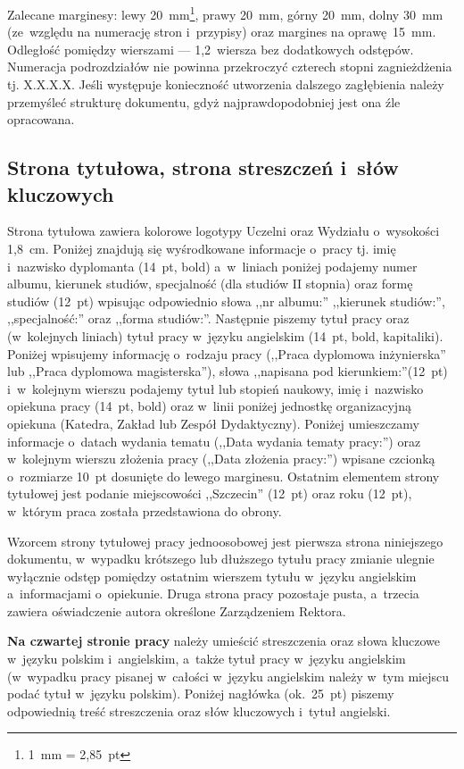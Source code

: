 \documentclass[skorowidz,skroty]{dyplomWEZUT}
\begin{document}
Zalecane marginesy: lewy 20~mm\footnote{1~mm = 2,85~pt}, prawy 20~mm, górny 20~mm, dolny 30~mm (ze~względu na numerację stron i~przypisy) oraz margines na oprawę~15~mm. Odległość pomiędzy wierszami --- 1,2~wiersza bez dodatkowych odstępów. Numeracja podrozdziałów nie powinna przekroczyć czterech stopni zagnieżdżenia tj. X.X.X.X. Jeśli występuje konieczność utworzenia dalszego zagłębienia należy przemyśleć strukturę dokumentu, gdyż najprawdopodobniej jest ona źle opracowana.

\subsection{Strona tytułowa, strona streszczeń i~słów kluczowych}

Strona tytułowa zawiera kolorowe logotypy Uczelni oraz Wydziału o~wysokości 1,8~cm. Poniżej znajdują się wyśrodkowane informacje o~pracy tj. imię i~nazwisko dyplomanta (14~pt, bold) a~w~liniach poniżej podajemy numer albumu, kierunek studiów, specjalność (dla studiów II stopnia) oraz formę studiów (12~pt) wpisując odpowiednio słowa ,,nr albumu:'' ,,kierunek studiów:'', ,,specjalność:'' oraz ,,forma studiów:''. Następnie piszemy tytuł pracy oraz (w~kolejnych liniach) tytuł pracy w~języku angielskim (14~pt, bold, kapitaliki). Poniżej wpisujemy informację o~rodzaju pracy (,,Praca dyplomowa inżynierska'' lub ,,Praca dyplomowa magisterska''), słowa ,,napisana pod kierunkiem:''(12~pt) i~w~kolejnym wierszu podajemy tytuł lub stopień naukowy, imię i~nazwisko opiekuna pracy (14~pt, bold) oraz w~linii poniżej jednostkę organizacyjną opiekuna (Katedra, Zakład lub Zespół Dydaktyczny). Poniżej umieszczamy informacje o~datach wydania tematu (,,Data wydania tematy pracy:'') oraz w~kolejnym wierszu złożenia pracy (,,Data złożenia pracy:'') wpisane czcionką o~rozmiarze 10~pt dosunięte do lewego marginesu. Ostatnim elementem strony tytułowej jest podanie miejscowości ,,Szczecin'' (12~pt) oraz roku (12~pt), w~którym praca została przedstawiona do obrony.

Wzorcem strony tytułowej pracy jednoosobowej jest pierwsza strona niniejszego dokumentu, w~wypadku krótszego lub dłuższego tytułu pracy zmianie ulegnie wyłącznie odstęp pomiędzy ostatnim wierszem tytułu w~języku angielskim a~informacjami o~opiekunie. Druga strona pracy pozostaje pusta, a~trzecia zawiera oświadczenie autora określone Zarządzeniem Rektora.

\textbf{Na czwartej stronie pracy} należy umieścić streszczenia oraz słowa kluczowe w~języku polskim i~angielskim, a~także tytuł pracy w~języku angielskim (w~wypadku pracy pisanej w~całości w~języku angielskim należy w~tym miejscu podać tytuł w~języku polskim). Poniżej nagłówka (ok.~25~pt) piszemy odpowiednią treść streszczenia oraz słów kluczowych i~tytuł angielski.
\end{document}
